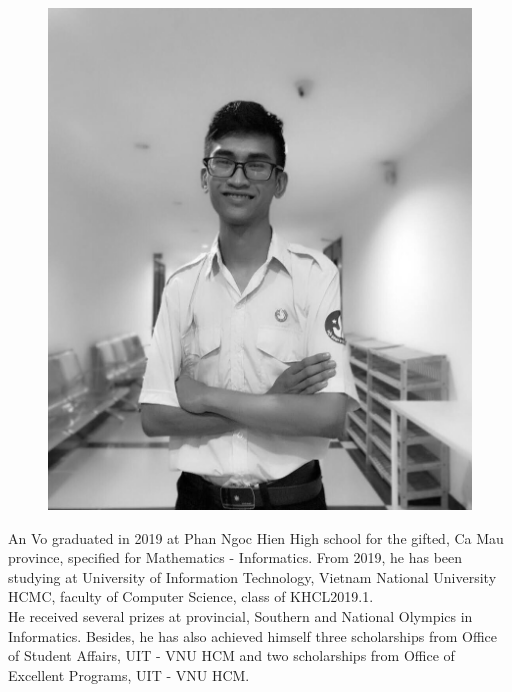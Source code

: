 \documentclass[conference,compsoc]{IEEEtran}
\begin{document}
\begin{figure}[h!]
    \centering
    \includegraphics[scale=0.1]{AV}
    \label{fig:my_label}
\end{figure}
An Vo graduated in 2019 at Phan Ngoc Hien High school for the gifted, Ca Mau province, specified for Mathematics - Informatics. From 2019, he has been studying at University of Information Technology, Vietnam National University HCMC, faculty of Computer Science, class of KHCL2019.1.\\

He received several prizes at provincial, Southern and National Olympics in Informatics. Besides, he has also achieved himself three scholarships from Office of Student Affairs, UIT - VNU HCM and two scholarships from Office of Excellent Programs, UIT - VNU HCM.
\end{document}
